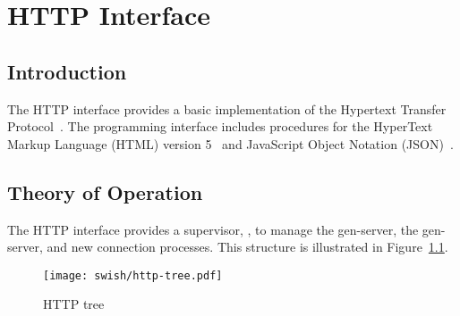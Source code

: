 %
%
%

\chapter {HTTP Interface}\label{chap:http}

\section {Introduction}

The HTTP interface provides a basic implementation of the Hypertext
Transfer Protocol~\cite{RFC7230}. The programming interface includes
procedures for the HyperText Markup Language (HTML) version
5~\cite{html5} and JavaScript Object Notation (JSON)~\cite{RFC7159}.

\section {Theory of Operation}

The HTTP interface provides a supervisor, , to manage
the  gen-server, the 
gen-server, and new connection processes. This structure is
illustrated in Figure~\ref{fig:http-tree}.

\begin{figure}
  \center\texttt{[image: swish/http-tree.pdf]}
  \caption{\label{fig:http-tree}HTTP tree}
\end{figure}

